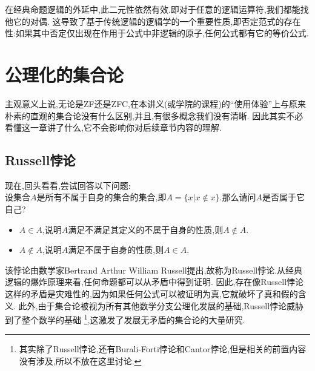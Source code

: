 \documentclass[12pt, a4paper, oneside]{ctexbook}
\begin{document}
  在经典命题逻辑的外延中,此二元性依然有效.即对于任意的逻辑运算符,我们都能找他它的对偶.
  这导致了基于传统逻辑的逻辑学的一个重要性质,即否定范式的存在性:如果其中否定仅出现在作用于公式中非逻辑的原子,任何公式都有它的等价公式.

  \section{公理化的集合论}\label{myref:gonglihua}
  主观意义上说,无论是ZF还是ZFC,在本讲义(或学院的课程)的“使用体验”上与原来朴素的直观的集合论没有什么区别,并且,有很多概念我们没有清晰.
  因此其实不必看懂这一章讲了什么,它不会影响你对后续章节内容的理解.
  \subsection{Russell悖论}
  现在,回头看看,尝试回答以下问题:\\
  设集合$A$是所有不属于自身的集合的集合,即$A=\{x | x\notin x\}$.那么请问$A$是否属于它自己?
  \begin{itemize}
    \item $A\in A$,说明$A$满足不满足其定义的不属于自身的性质,则$A\notin A$.
    \item $A\notin A$,说明$A$满足不属于自身的性质,则$A\in A$.
  \end{itemize}


  该悖论由数学家Bertrand Arthur William Russell提出,故称为Russell悖论.从经典逻辑的爆炸原理来看,任何命题都可以从矛盾中得到证明.
  因此,存在像Russell悖论这样的矛盾是灾难性的,因为如果任何公式可以被证明为真,它就破坏了真和假的含义.
  此外,由于集合论被视为所有其他数学分支公理化发展的基础,Russell悖论威胁到了整个数学的基础
  \footnote{
    其实除了Russell悖论,还有Burali-Forti悖论和Cantor悖论,但是相关的前置内容没有涉及,所以不放在这里讨论.
  },这激发了发展无矛盾的集合论的大量研究.
\end{document}
